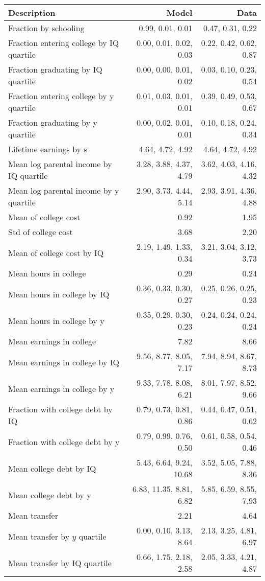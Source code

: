 \begin{tabular}{lrr}
\hline
Description & Model  & Data  \\
\hline
Fraction by schooling & 0.99, 0.01, 0.01  & 0.47, 0.31, 0.22  \\
Fraction entering college by IQ quartile & 0.00, 0.01, 0.02, 0.03  & 0.22, 0.42, 0.62, 0.87  \\
Fraction graduating by IQ quartile & 0.00, 0.00, 0.01, 0.02  & 0.03, 0.10, 0.23, 0.54  \\
Fraction entering college by y quartile & 0.01, 0.03, 0.01, 0.01  & 0.39, 0.49, 0.53, 0.67  \\
Fraction graduating by y quartile & 0.00, 0.02, 0.01, 0.01  & 0.10, 0.18, 0.24, 0.34  \\
Lifetime earnings by s & 4.64, 4.72, 4.92  & 4.64, 4.72, 4.92  \\
Mean log parental income by IQ quartile & 3.28, 3.88, 4.37, 4.79  & 3.62, 4.03, 4.16, 4.32  \\
Mean log parental income by y quartile & 2.90, 3.73, 4.44, 5.14  & 2.93, 3.91, 4.36, 4.88  \\
Mean of college cost & 0.92  & 1.95  \\
Std of college cost & 3.68  & 2.20  \\
Mean of college cost by IQ & 2.19, 1.49, 1.33, 0.34  & 3.21, 3.04, 3.12, 3.73  \\
Mean hours in college & 0.29  & 0.24  \\
Mean hours in college by IQ & 0.36, 0.33, 0.30, 0.27  & 0.25, 0.26, 0.25, 0.23  \\
Mean hours in college by y & 0.35, 0.29, 0.30, 0.23  & 0.24, 0.24, 0.24, 0.24  \\
Mean earnings in college & 7.82  & 8.66  \\
Mean earnings in college by IQ & 9.56, 8.77, 8.05, 7.17  & 7.94, 8.94, 8.67, 8.73  \\
Mean earnings in college by y & 9.33, 7.78, 8.08, 6.21  & 8.01, 7.97, 8.52, 9.66  \\
Fraction with college debt by IQ & 0.79, 0.73, 0.81, 0.86  & 0.44, 0.47, 0.51, 0.62  \\
Fraction with college debt by y & 0.79, 0.99, 0.76, 0.50  & 0.61, 0.58, 0.54, 0.46  \\
Mean college debt by IQ & 5.43, 6.64, 9.24, 10.68  & 3.52, 5.05, 7.88, 8.36  \\
Mean college debt by y & 6.83, 11.35, 8.81, 6.82  & 5.85, 6.59, 8.55, 7.93  \\
Mean transfer & 2.21  & 4.64  \\
Mean transfer by $y$ quartile & 0.00, 0.10, 3.13, 8.64  & 2.13, 3.25, 4.81, 6.97  \\
Mean transfer by IQ quartile & 0.66, 1.75, 2.18, 2.58  & 2.05, 3.33, 4.21, 4.87  \\
\hline
\end{tabular}%
